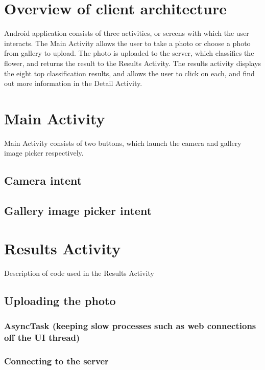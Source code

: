 \documentclass[11pt, a4paper]{report}
\begin{document}
\section{Overview of client architecture}
Android application consists of three activities, or screens with which the user interacts. The Main Activity allows the user to take a photo or choose a photo from gallery to upload. The photo is uploaded to the server, which classifies the flower, and returns the result to the Results Activity. The results activity displays the eight top classification results, and allows the user to click on each, and find out more information in the Detail Activity. 

\section{Main Activity}

Main Activity consists of two buttons, which launch the camera and gallery image picker respectively.

\subsection{Camera intent}

\subsection{Gallery image picker intent}

\section{Results Activity}

Description of code used in the Results Activity

\subsection{Uploading the photo}

\subsubsection{AsyncTask (keeping slow processes such as web connections off the UI thread)}

\subsubsection{Connecting to the server}
\end{document}
